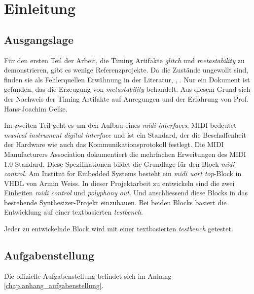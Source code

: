 
\chapter{Einleitung}\label{chap.einleitung}


\section{Ausgangslage}\label{sect.einleitung_ausgangslage}
Für den ersten Teil der Arbeit, die Timing Artifakte  \textit{glitch} und \textit{metastability} zu demonstrieren, gibt es wenige Referenzprojekte. Da die Zustände ungewollt sind, finden sie als Fehlerquellen Erwähnung in der Literatur\cite{ReferenceManual},  \cite{F_glitches}, \cite{F_metastability}. Nur ein Dokument ist gefunden, das die Erzeugung von \textit{ metastability} behandelt\cite{Metastabil}. Aus diesem Grund sich der Nachweis der Timing Artifakte auf Anregungen und der Erfahrung von Prof. Hans-Joachim Gelke.


Im zweiten Teil geht es um den Aufbau eines \textit{midi interfaces}. MIDI bedeutet \textit{musical instrument digital interface} und ist ein Standard, der die Beschaffenheit der Hardware wie auch das Kommunikationsprotokoll festlegt\cite{Midi_Braut}. Die MIDI Manufacturers Association dokumentiert die mehrfachen Erweitungen des MIDI 1.0 Standard\cite{Midi_specification}. Diese Spezifikationen bildet die Grundlage für den Block \textit{midi control}. Am Institut for Embedded Systems besteht ein \textit{midi uart top}-Block in VHDL von Armin Weiss. In dieser Projektarbeit zu entwickeln sind die zwei Einheiten \textit{midi control}  und \textit{polyphony out}. Und anschliessend diese Blocks in das bestehende Synthesizer-Projekt einzubauen. Bei beiden Blocks basiert die Entwicklung auf einer textbasierten \textit{testbench}.


Jeder zu entwickelnde Block wird mit einer textbasierten \textit{testbench} getestet. 

\section{Aufgabenstellung}\label{sect.einleitung_ziele}
Die offizielle Aufgabenstellung befindet sich im Anhang \ref{chap.anhang_aufgabenstellung}. 
 
